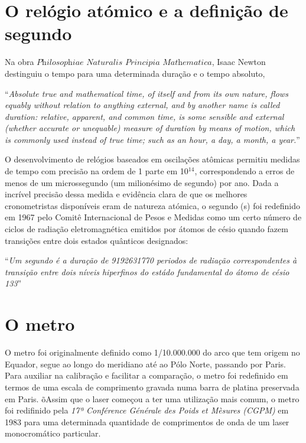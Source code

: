 \documentclass[
  portuguese,
  ]{book}
\begin{document}
\hypertarget{o-reluxf3gio-atuxf3mico-e-a-definiuxe7uxe3o-de-segundo}{%
\section{O relógio atómico e a definição de segundo}\label{o-reluxf3gio-atuxf3mico-e-a-definiuxe7uxe3o-de-segundo}}

Na obra \(\textit{Philosophiae Naturalis Principia Mathematica}\), Isaac Newton destinguiu o tempo para uma determinada duração e o tempo absoluto,

``\emph{Absolute true and mathematical time, of itself and from its own nature, flows equably without relation to anything external, and by another name is called duration: relative, apparent, and common time, is some sensible and external (whether accurate or unequable) measure of duration by means of motion, which is commonly used instead of true time; such as an hour, a day, a month, a year.}''

O desenvolvimento de relógios baseados em oscilações atômicas permitiu medidas de tempo com precisão na ordem de 1 parte em 10\(^{14}\), correspondendo a erros de menos de um microssegundo (um milionésimo de segundo) por ano. Dada a incrível precisão dessa medida e evidência clara de que os melhores cronometristas disponíveis eram de natureza atómica, o segundo (s) foi redefinido em 1967 pelo Comitê Internacional de Pesos e Medidas como um certo número de ciclos de radiação eletromagnética emitidos por átomos de césio quando fazem transições entre dois estados quânticos designados:

``\emph{Um segundo é a duração de 9192631770 periodos de radiação correspondentes à transição entre dois níveis hiperfinos do estádo fundamental do átomo de césio 133}''

\hypertarget{o-metro}{%
\section{O metro}\label{o-metro}}

O metro foi originalmente definido como 1/10.000.000 do arco que tem origem no Equador, segue ao longo do meridiano até ao Pólo Norte, passando por Paris. Para auxiliar na calibração e facilitar a comparação, o metro foi redefinido em termos de uma escala de comprimento gravada numa barra de platina preservada em Paris. õAssim que o laser começou a ter uma utilização mais comum, o metro foi redifinido pela \emph{17ª Conférence Générale des Poids et Mèsures (CGPM)} em 1983 para uma determinada quantidade de comprimentos de onda de um laser monocromático particular.
\end{document}
